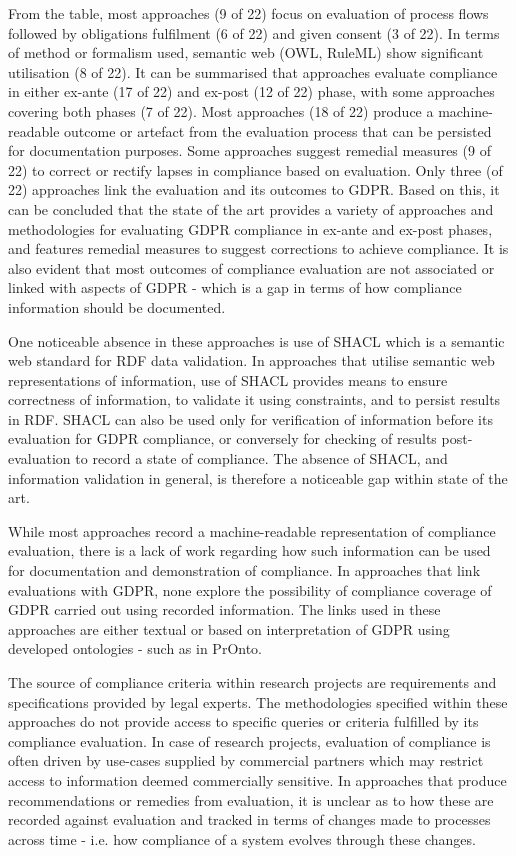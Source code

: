 From the table, most approaches (9 of 22) focus on evaluation of process flows followed by obligations fulfilment (6 of 22) and given consent (3 of 22). In terms of method or formalism used, semantic web (OWL, RuleML) show significant utilisation (8 of 22). It can be summarised that approaches evaluate compliance in either ex-ante (17 of 22) and ex-post (12 of 22) phase, with some approaches covering both phases (7 of 22).
Most approaches (18 of 22) produce a machine-readable outcome or artefact from the evaluation process that can be persisted for documentation purposes. Some approaches suggest remedial measures (9 of 22) to correct or rectify lapses in compliance based on evaluation. Only three (of 22) approaches link the evaluation and its outcomes to GDPR. Based on this, it can be concluded that the state of the art provides a variety of approaches and methodologies for evaluating GDPR compliance in ex-ante and ex-post phases, and features remedial measures to suggest corrections to achieve compliance. It is also evident that most outcomes of compliance evaluation are not associated or linked with aspects of GDPR - which is a gap in terms of how compliance information should be documented.

One noticeable absence in these approaches is use of SHACL which is a semantic web standard for RDF data validation. In approaches that utilise semantic web representations of information, use of SHACL provides means to ensure correctness of information, to validate it using constraints, and to persist results in RDF. SHACL can also be used only for verification of information before its evaluation for GDPR compliance, or conversely for checking of results post-evaluation to record a state of compliance.
The absence of SHACL, and information validation in general, is therefore a noticeable gap within state of the art.

While most approaches record a machine-readable representation of compliance evaluation, there is a lack of work regarding how such information can be used for documentation and demonstration of compliance. In approaches that link evaluations with GDPR, none explore the possibility of compliance coverage of GDPR carried out using recorded information. The links used in these approaches are either textual or based on interpretation of GDPR using developed ontologies - such as in PrOnto.

The source of compliance criteria within research projects are requirements and specifications provided by legal experts. The methodologies specified within these approaches do not provide access to specific queries or criteria fulfilled by its compliance evaluation.
In case of research projects, evaluation of compliance is often driven by use-cases supplied by commercial partners which may restrict access to information deemed commercially sensitive.
In approaches that produce recommendations or remedies from evaluation, it is unclear as to how these are recorded against evaluation and tracked in terms of changes made to processes across time - i.e. how compliance of a system evolves through these changes. 

